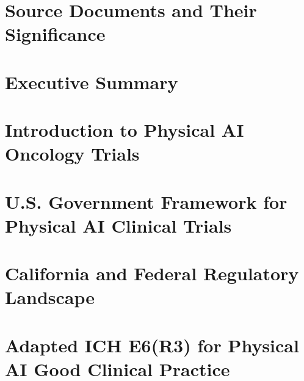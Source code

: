 \documentclass[a4paper,12pt,twoside]{article}
\begin{document}
\pagestyle{body}




\newpage

\section*{Source Documents and Their Significance}

\newpage

\section*{Executive Summary}

\newpage

\pagestyle{body}

\section{Introduction to Physical AI Oncology Trials}
\label{sec:introduction}

\newpage

\section{U.S. Government Framework for Physical AI Clinical Trials}
\label{sec:gov-framework}

\newpage

\section{California and Federal Regulatory Landscape}
\label{sec:regulatory-landscape}

\newpage

\section{Adapted ICH E6(R3) for Physical AI Good Clinical Practice}
\label{sec:ich-e6r3}

\newpage

\end{document}
